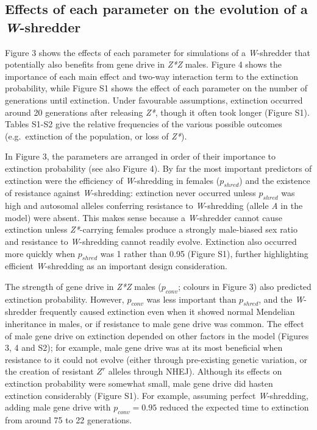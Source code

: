 \documentclass[]{rsos}%
\begin{document}
\hypertarget{effects-of-each-parameter-on-the-evolution-of-a-w-shredder}{%
\subsection{\texorpdfstring{Effects of each parameter on the evolution
of a
\emph{W}-shredder}{Effects of each parameter on the evolution of a W-shredder}}\label{effects-of-each-parameter-on-the-evolution-of-a-w-shredder}}

Figure 3 shows the effects of each parameter for simulations of a
\emph{W}-shredder that potentially also benefits from gene drive in
\emph{Z*Z} males. Figure 4 shows the importance of each main effect and
two-way interaction term to the extinction probability, while Figure S1
shows the effect of each parameter on the number of generations until
extinction. Under favourable assumptions, extinction occurred around 20
generations after releasing \emph{Z*}, though it often took longer
(Figure S1). Tables S1-S2 give the relative frequencies of the various
possible outcomes (e.g.~extinction of the population, or loss of
\emph{Z*}).

In Figure 3, the parameters are arranged in order of their importance to
extinction probability (see also Figure 4). By far the most important
predictors of extinction were the efficiency of \emph{W}-shredding in
females (\(p_{shred}\)) and the existence of resistance against
\emph{W}-shredding: extinction never occurred unless \(p_{shred}\) was
high and autosomal alleles conferring resistance to \emph{W}-shredding
(allele \emph{A} in the model) were absent. This makes sense because a
\emph{W}-shredder cannot cause extinction unless \emph{Z*}-carrying
females produce a strongly male-biased sex ratio and resistance to
\emph{W}-shredding cannot readily evolve. Extinction also occurred more
quickly when \(p_{shred}\) was 1 rather than 0.95 (Figure S1), further
highlighting efficient \emph{W}-shredding as an important design
consideration.

The strength of gene drive in \emph{Z*Z} males (\(p_{conv}\); colours in
Figure 3) also predicted extinction probability. However, \(p_{conv}\)
was less important than \(p_{shred}\), and the \emph{W}-shredder
frequently caused extinction even when it showed normal Mendelian
inheritance in males, or if resistance to male gene drive was common.
The effect of male gene drive on extinction depended on other factors in
the model (Figures 3, 4 and S2); for example, male gene drive was at its
most beneficial when resistance to it could not evolve (either through
pre-existing genetic variation, or the creation of resistant \(Z^r\)
alleles through NHEJ). Although its effects on extinction probability
were somewhat small, male gene drive did hasten extinction considerably
(Figure S1). For example, assuming perfect \emph{W}-shredding, adding
male gene drive with \(p_{conv} = 0.95\) reduced the expected time to
extinction from around 75 to 22 generations.
\end{document}
